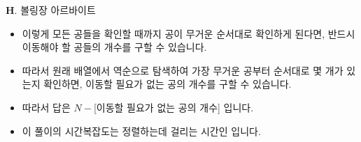 \begin{frame}{\textbf{H}. 볼링장 아르바이트}
	\begin{itemize}
		\item 이렇게 모든 공들을 확인할 때까지 공이 무거운 순서대로 확인하게 된다면, 반드시 이동해야 할 공들의 개수를 구할 수 있습니다.
		\item 따라서 원래 배열에서 역순으로 탐색하여 가장 무거운 공부터 순서대로 몇 개가 있는지 확인하면, 이동할 필요가 없는 공의 개수를 구할 수 있습니다.
		\item 따라서 답은 $N - $[이동할 필요가 없는 공의 개수] 입니다.
		\item 이 풀이의 시간복잡도는 정렬하는데 걸리는 시간인  입니다.
	\end{itemize}
\end{frame}
